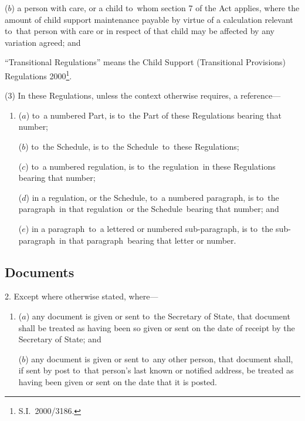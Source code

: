 \documentclass[12pt,a4paper]{article}
\begin{document}
\begin{enumerate}
\begin{enumerate}
($b$) 
a person with care, or a child to~whom section 7 of the Act applies, where the amount of child support maintenance payable by virtue of a calculation relevant to~that person with care or in respect of that child may be affected by any variation agreed; and
\end{enumerate}

“Transitional Regulations” means the Child Support (Transitional Provisions) Regulations 2000\footnote{S.I.\ 2000/3186.}.
\end{enumerate}

(3) In these Regulations, unless the context otherwise requires, a reference—
\begin{enumerate}\item[]
($a$) to~a numbered Part, is to~the Part of these Regulations bearing that number;

($b$) to~the Schedule, is to~the Schedule~to~these Regulations;

($c$) to~a numbered regulation, is to~the regulation~in these Regulations bearing that number;

($d$) in a regulation, or the Schedule, to~a numbered paragraph, is to~the paragraph~in that regulation~or the Schedule~bearing that number; and

($e$) in a paragraph~to~a lettered or numbered sub-paragraph, is to~the sub-paragraph~in that paragraph~bearing that letter or number.
\end{enumerate}


\subsection[2. Documents]{Documents}

2.  Except where otherwise stated, where—
\begin{enumerate}\item[]
($a$) any document is given or sent to~the Secretary of State, that document shall be treated as having been so given or sent on the date of receipt by the Secretary of State; and

($b$) any document is given or sent to~any other person, that document shall, if sent by post to~that person’s last known or notified address, be treated as having been given or sent on the date that it is posted.
\end{enumerate}
\end{document}
